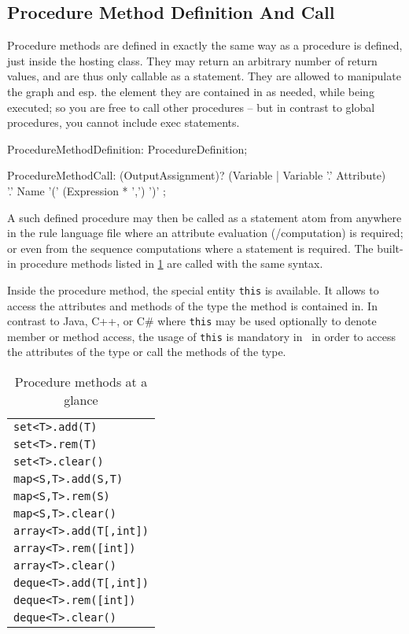 \subsection{Procedure Method Definition And Call}\label{sub:proceduremethods}\label{sec:procmethcall} 

Procedure methods are defined in exactly the same way as a procedure is defined, just inside the hosting class.
They may return an arbitrary number of return values, and are thus only callable as a statement.
They are allowed to manipulate the graph and esp. the element they are contained in as needed, while being executed;
so you are free to call other procedures -- but in contrast to global procedures, you cannot include exec statements.

\begin{rail} 
  ProcedureMethodDefinition: ProcedureDefinition;
\end{rail}

\begin{rail}
  ProcedureMethodCall: (OutputAssignment)? (Variable | Variable '.' Attribute) \\
		'.' Name '(' (Expression * ',') ')' ;
\end{rail}

A such defined procedure may then be called as a statement atom from anywhere in the rule language file where an attribute evaluation (/computation) is required; or even from the sequence computations where a statement is required.
The built-in procedure methods listed in \ref{procmethstab} are called with the same syntax.

Inside the procedure method, the special entity \texttt{this} is available.
It allows to access the attributes and methods of the type the method is contained in.
In contrast to Java, C++, or C\# where \texttt{this} may be used optionally to denote member or method access,
the usage of \texttt{this} is mandatory in \GrG~in order to access the attributes of the type or call the methods of the type.


\begin{table}[htbp]
\centering
\begin{tabular}{|l|}
\hline
\texttt{set<T>.add(T)}\\
\texttt{set<T>.rem(T)}\\
\texttt{set<T>.clear()}\\
\hline
\texttt{map<S,T>.add(S,T)}\\
\texttt{map<S,T>.rem(S)}\\
\texttt{map<S,T>.clear()}\\
\hline
\texttt{array<T>.add(T[,int])}\\
\texttt{array<T>.rem([int])}\\
\texttt{array<T>.clear()}\\
\hline
\texttt{deque<T>.add(T[,int])}\\
\texttt{deque<T>.rem([int])}\\
\texttt{deque<T>.clear()}\\
\hline
\end{tabular}
\caption{Procedure methods at a glance}
\label{procmethstab}
\end{table}


